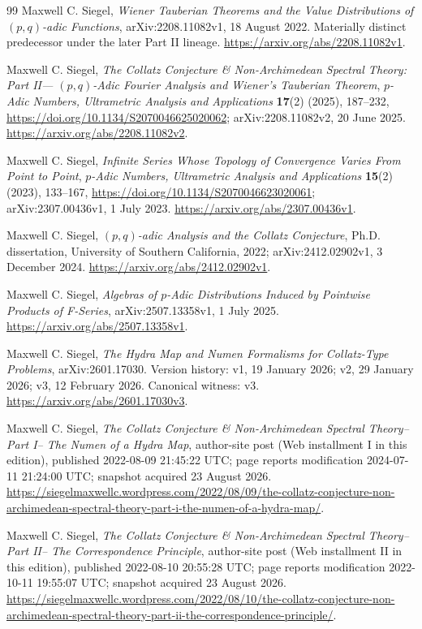 \begin{thebibliography}{99}
Maxwell C. Siegel,
\emph{Wiener Tauberian Theorems and the Value Distributions of $(p,q)$-adic
Functions}, arXiv:2208.11082v1, 18 August 2022.  Materially distinct
predecessor under the later Part II lineage.
\url{https://arxiv.org/abs/2208.11082v1}.

Maxwell C. Siegel,
\emph{The Collatz Conjecture \& Non-Archimedean Spectral Theory: Part II---
$(p,q)$-Adic Fourier Analysis and Wiener's Tauberian Theorem},
\emph{$p$-Adic Numbers, Ultrametric Analysis and Applications}
\textbf{17}(2) (2025), 187--232,
\url{https://doi.org/10.1134/S2070046625020062};
arXiv:2208.11082v2, 20 June 2025.
\url{https://arxiv.org/abs/2208.11082v2}.

Maxwell C. Siegel,
\emph{Infinite Series Whose Topology of Convergence Varies From Point to
Point}, \emph{$p$-Adic Numbers, Ultrametric Analysis and Applications}
\textbf{15}(2) (2023), 133--167,
\url{https://doi.org/10.1134/S2070046623020061};
arXiv:2307.00436v1, 1 July 2023.
\url{https://arxiv.org/abs/2307.00436v1}.

Maxwell C. Siegel,
\emph{$(p,q)$-adic Analysis and the Collatz Conjecture}, Ph.D. dissertation,
University of Southern California, 2022; arXiv:2412.02902v1,
3 December 2024.  \url{https://arxiv.org/abs/2412.02902v1}.

Maxwell C. Siegel,
\emph{Algebras of $p$-Adic Distributions Induced by Pointwise Products of
F-Series}, arXiv:2507.13358v1, 1 July 2025.
\url{https://arxiv.org/abs/2507.13358v1}.

Maxwell C. Siegel,
\emph{The Hydra Map and Numen Formalisms for Collatz-Type Problems},
arXiv:2601.17030.  Version history: v1, 19 January 2026; v2,
29 January 2026; v3, 12 February 2026.  Canonical witness: v3.
\url{https://arxiv.org/abs/2601.17030v3}.

Maxwell C. Siegel,
\emph{The Collatz Conjecture \& Non-Archimedean Spectral Theory--Part I--
The Numen of a Hydra Map}, author-site post (Web installment I in this
edition), published 2022-08-09 21:45:22 UTC; page reports modification
2024-07-11 21:24:00 UTC; snapshot acquired 23 August 2026.
\url{https://siegelmaxwellc.wordpress.com/2022/08/09/the-collatz-conjecture-non-archimedean-spectral-theory-part-i-the-numen-of-a-hydra-map/}.

Maxwell C. Siegel,
\emph{The Collatz Conjecture \& Non-Archimedean Spectral Theory--Part II--
The Correspondence Principle}, author-site post (Web installment II in this
edition), published 2022-08-10 20:55:28 UTC; page reports modification
2022-10-11 19:55:07 UTC; snapshot acquired 23 August 2026.
\url{https://siegelmaxwellc.wordpress.com/2022/08/10/the-collatz-conjecture-non-archimedean-spectral-theory-part-ii-the-correspondence-principle/}.


\end{thebibliography}
